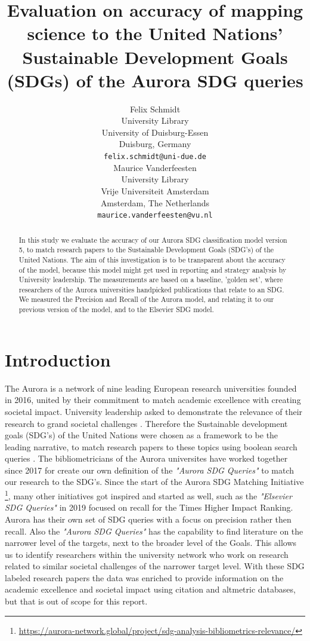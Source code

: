 \documentclass{article}
\title{Evaluation on accuracy of mapping science to the United Nations' Sustainable Development Goals (SDGs) of the Aurora SDG queries}
\author{
  Felix Schmidt \\
  University Library\\
  University of Duisburg-Essen\\
  Duisburg, Germany\\
  \texttt{felix.schmidt@uni-due.de} \\
   \And
Maurice Vanderfeesten \\
  University Library\\
  Vrije Universiteit Amsterdam\\
  Amsterdam, The Netherlands \\
  \texttt{maurice.vanderfeesten@vu.nl} \\
}
\begin{document}
\maketitle

\begin{abstract}
In this study we evaluate the accuracy of our Aurora SDG classification model version 5, to match research papers to the Sustainable Development Goals (SDG's) of the United Nations. The aim of this investigation is to be transparent about the accuracy of the model, because this model might get used in reporting and strategy analysis by University leadership. The measurements are based on a baseline, 'golden set', where researchers of the Aurora universities handpicked publications that relate to an SDG. We measured the Precision and Recall of the Aurora model, and relating it to our previous version of the model, and to the Elsevier SDG model. 
\end{abstract}




\section{Introduction}
The Aurora is a network of nine leading European research universities founded in 2016, united by their commitment to match academic excellence with creating societal impact. University leadership asked to demonstrate the relevance of their research to grand societal challenges \cite{drooge_evaluating_2010} \cite{carley_social_2019}. Therefore the Sustainable development goals (SDG's) of the United Nations were chosen as a framework to be the leading narrative, to match research papers to these topics using boolean search queries \cite{armitage_mapping_2020}. The bibliometricians of the Aurora universites have worked together since 2017 for create our own definition of the \emph{"Aurora SDG Queries"} to match our research to the SDG's. Since the start of the Aurora SDG Matching Initiative \footnote{\url{https://aurora-network.global/project/sdg-analysis-bibliometrics-relevance/}}, many other initiatives got inspired and started as well, such as the \emph{"Elsevier SDG Queries"} \cite{jayabalasingham_identifying_2019}  in 2019 focused on recall for the Times Higher Impact Ranking. Aurora has their own set of SDG queries with a focus on precision rather then recall. Also the \emph{"Aurora SDG Queries"} has the capability to find literature on the narrower level of the targets, next to the broader level of the Goals. This allows us to identify researchers within the university network who work on research related to similar societal challenges of the narrower target level.  With these SDG labeled research papers the data was enriched to provide information on the academic excellence and societal impact \cite{bornmann_what_2013} using citation and altmetric databases, but that is out of scope for this report. 
\end{document}
